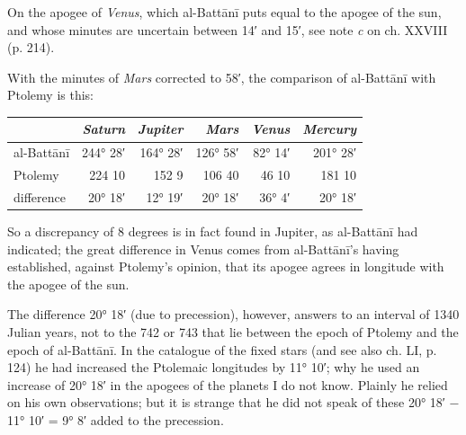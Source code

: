 \documentclass[11pt]{article}
\newcommand{\Pg}[1]{\marginpar{\footnotesize\color{gray}#1}}
\begin{document}
\par On the apogee of \emph{Venus}, which al-Battānī puts equal to the apogee of the sun, and whose minutes are uncertain between 14′ and 15′, see note \emph{c} on ch. XXVIII (p. 214).\par
\par With the minutes of \emph{Mars} corrected to 58′, the comparison of al-Battānī with Ptolemy is this:\par
\Pg{I 241}\begin{center}\small\begin{tabular}{lrrrrr}
 & \emph{Saturn} & \emph{Jupiter} & \emph{Mars} & \emph{Venus} & \emph{Mercury} \\
\midrule
al-Battānī & 244° 28′ & 164° 28′ & 126° 58′ & 82° 14′ & 201° 28′ \\
Ptolemy & 224 10 & 152 9 & 106 40 & 46 10 & 181 10 \\
\midrule
difference & 20° 18′ & 12° 19′ & 20° 18′ & 36° 4′ & 20° 18′ \\
\end{tabular}\end{center}
\par So a discrepancy of 8 degrees is in fact found in Jupiter, as al-Battānī had indicated; the great difference in Venus comes from al-Battānī's having established, against Ptolemy's opinion, that its apogee agrees in longitude with the apogee of the sun.\par
\par The difference 20° 18′ (due to precession), however, answers to an interval of 1340 Julian years, not to the 742 or 743 that lie between the epoch of Ptolemy and the epoch of al-Battānī. In the catalogue of the fixed stars (and see also ch. LI, p. 124) he had increased the Ptolemaic longitudes by 11° 10′; why he used an increase of 20° 18′ in the apogees of the planets I do not know. Plainly he relied on his own observations; but it is strange that he did not speak of these 20° 18′ − 11° 10′ = 9° 8′ added to the precession.\par
\end{document}
